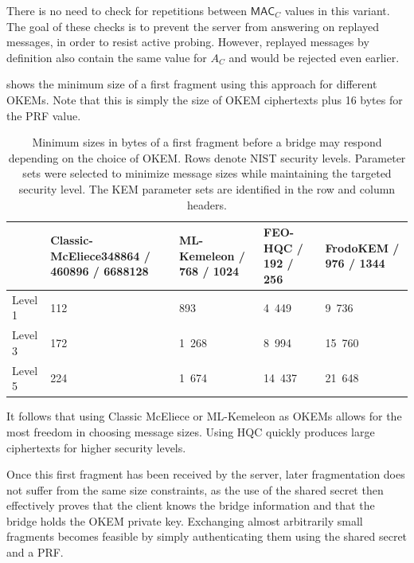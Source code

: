 There is no need to check for repetitions between $\mathsf{MAC}_C$ values in this variant. The goal of these checks is to prevent the server from answering on replayed messages, in order to resist active probing.
However, replayed messages by definition also contain the same value for $A_C$ and would be rejected even earlier.

 shows the minimum size of a first fragment using this approach for different OKEMs. Note that this is simply the size of OKEM ciphertexts plus 16 bytes for the PRF value.

\begin{table}
    \centering \small
    \begin{tabular}{@{} L{0.1\textwidth-\tabcolsep} | R{0.3\tabcolsep} R{0.2\tabcolsep} R{0.2\tabcolsep} R{0.2\textwidth-\tabcolsep} @{}}
        & Classic-McEliece\newline \footnotesize 348864 / 460896 / 6688128
        & ML-Kemeleon / 768 / 1024
        & FEO-HQC / 192 / 256
        & FrodoKEM / 976 / 1344
        \\ \hline
    Level 1 & 112 & 893 & 4~449 & 9~736 \\
    Level 3 & 172 & 1~268 & 8~994 & 15~760 \\
    Level 5 & 224 & 1~674 & 14~437 & 21~648
    \end{tabular}
    \caption[
        Minimum sizes in bytes of a first fragment before a bridge may respond depending on the choice of OKEM.
    ]{
        Minimum sizes in bytes of a first fragment before a bridge may respond depending on the choice of OKEM. Rows denote NIST security levels. Parameter sets were selected to minimize message sizes while maintaining the targeted security level. The KEM parameter sets are identified in the row and column headers.
    }
    \label{tab:frag-min-needed}
\end{table}

It follows that using Classic McEliece or ML-Kemeleon as OKEMs allows for the most freedom in choosing message sizes. Using HQC quickly produces large ciphertexts for higher security levels.

Once this first fragment has been received by the server, later fragmentation does not suffer from the same size constraints, as the use of the shared secret then effectively proves that the client knows the bridge information and that the bridge holds the OKEM private key. Exchanging almost arbitrarily small fragments becomes feasible by simply authenticating them using the shared secret and a PRF.


